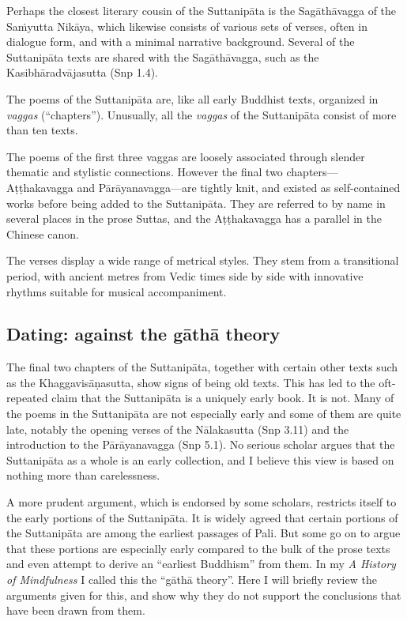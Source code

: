 \documentclass[12pt,openany]{book}%
\begin{document}
Perhaps the closest literary cousin of the \textsanskrit{Suttanipāta} is the \textsanskrit{Sagāthāvagga} of the \textsanskrit{Saṁyutta} \textsanskrit{Nikāya}, which likewise consists of various sets of verses, often in dialogue form, and with a minimal narrative background. Several of the \textsanskrit{Suttanipāta} texts are shared with the \textsanskrit{Sagāthāvagga}, such as the \textsanskrit{Kasibhāradvājasutta} (Snp 1.4).

The poems of the \textsanskrit{Suttanipāta} are, like all early Buddhist texts, organized in \textit{vaggas} (“chapters”). Unusually, all the \textit{vaggas} of the \textsanskrit{Suttanipāta} consist of more than ten texts.

The poems of the first three vaggas are loosely associated through slender thematic and stylistic connections. However the final two chapters—\textsanskrit{Aṭṭhakavagga} and \textsanskrit{Pārāyanavagga}—are tightly knit, and existed as self-contained works before being added to the \textsanskrit{Suttanipāta}. They are referred to by name in several places in the prose Suttas, and the \textsanskrit{Aṭṭhakavagga} has a parallel in the Chinese canon.

The verses display a wide range of metrical styles. They stem from a transitional period, with ancient metres from Vedic times side by side with innovative rhythms suitable for musical accompaniment.

\subsection*{Dating: against the \textsanskrit{gāthā} theory}

The final two chapters of the \textsanskrit{Suttanipāta}, together with certain other texts such as the \textsanskrit{Khaggavisāṇasutta}, show signs of being old texts. This has led to the oft-repeated claim that the \textsanskrit{Suttanipāta} is a uniquely early book. It is not. Many of the poems in the \textsanskrit{Suttanipāta} are not especially early and some of them are quite late, notably the opening verses of the \textsanskrit{Nālakasutta} (Snp 3.11) and the introduction to the \textsanskrit{Pārāyanavagga} (Snp 5.1). No serious scholar argues that the \textsanskrit{Suttanipāta} as a whole is an early collection, and I believe this view is based on nothing more than carelessness.

A more prudent argument, which is endorsed by some scholars, restricts itself to the early portions of the \textsanskrit{Suttanipāta}. It is widely agreed that certain portions of the \textsanskrit{Suttanipāta} are among the earliest passages of Pali. But some go on to argue that these portions are especially early compared to the bulk of the prose texts and even attempt to derive an “earliest Buddhism” from them. In my \textit{A History of Mindfulness} I called this the “\textsanskrit{gāthā} theory”. Here I will briefly review the arguments given for this, and show why they do not support the conclusions that have been drawn from them.
\end{document}
